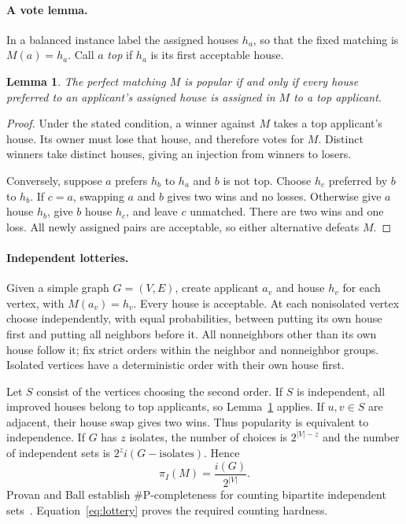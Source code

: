 \documentclass[11pt]{article}
\newtheorem{lemma}{Lemma}
\newcommand{\sharpP}{\#\mathrm P}
\begin{document}
\paragraph{A vote lemma.}
In a balanced instance label the assigned houses $h_a$, so that the fixed matching is $M(a)=h_a$. Call $a$ \emph{top} if $h_a$ is its first acceptable house.
\begin{lemma}\label{lem:vote}
The perfect matching $M$ is popular if and only if every house preferred to an applicant's assigned house is assigned in $M$ to a top applicant.
\end{lemma}
\begin{proof}
Under the stated condition, a winner against $M$ takes a top applicant's house. Its owner must lose that house, and therefore votes for $M$. Distinct winners take distinct houses, giving an injection from winners to losers.

Conversely, suppose $a$ prefers $h_b$ to $h_a$ and $b$ is not top. Choose $h_c$ preferred by $b$ to $h_b$. If $c=a$, swapping $a$ and $b$ gives two wins and no losses. Otherwise give $a$ house $h_b$, give $b$ house $h_c$, and leave $c$ unmatched. There are two wins and one loss. All newly assigned pairs are acceptable, so either alternative defeats $M$.
\end{proof}

\paragraph{Independent lotteries.}
Given a simple graph $G=(V,E)$, create applicant $a_v$ and house $h_v$ for each vertex, with $M(a_v)=h_v$. Every house is acceptable. At each nonisolated vertex choose independently, with equal probabilities, between putting its own house first and putting all neighbors before it. All nonneighbors other than its own house follow it; fix strict orders within the neighbor and nonneighbor groups. Isolated vertices have a deterministic order with their own house first.

Let $S$ consist of the vertices choosing the second order. If $S$ is independent, all improved houses belong to top applicants, so Lemma~\ref{lem:vote} applies. If $u,v\in S$ are adjacent, their house swap gives two wins. Thus popularity is equivalent to independence. If $G$ has $z$ isolates, the number of choices is $2^{|V|-z}$ and the number of independent sets is $2^z i(G-\text{isolates})$. Hence
\begin{equation}\label{eq:lottery}
 \pi_I(M)=\frac{i(G)}{2^{|V|}}.
\end{equation}
Provan and Ball establish $\sharpP$-completeness for counting bipartite independent sets~\cite[\S1, problem~2; \S2, reduction~2]{pb}. Equation~\eqref{eq:lottery} proves the required counting hardness.
\end{document}
